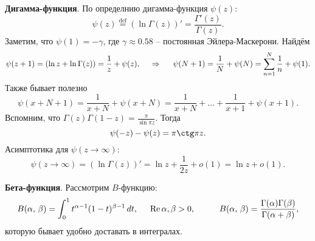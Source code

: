 \textbf{Дигамма-функция}. По определнию дигамма-функция $\psi(z)$:
\begin{equation*}
    \psi(z) \overset{\mathrm{def}}{=}  \left(\ln \Gamma(z)\right)' = \frac{\Gamma'(z)}{\Gamma(z)}.
\end{equation*}
Заметим, что $\psi(1) = - \gamma$, где $\gamma \approx 0.58$ -- постоянная Эйлера-Маскерони. Найдём
\begin{equation*}
    \psi(z+1)= \left(\ln z + \ln \Gamma(z)\right) = \frac{1}{z} + \psi(z),
    \hspace{0.5cm} \Rightarrow \hspace{0.5cm}
    \psi(N+1) = \frac{1}{N} + \psi(N) = \sum_{n=1}^{N} \frac{1}{n} + \psi(1).
\end{equation*}
Также бывает полезно
\begin{equation*}
    \psi(x + N + 1) = \frac{1}{x + N} + \psi(x+ N) = \frac{1}{x+N} + \ldots + \frac{1}{x+1} + \psi(x+1).
\end{equation*}
Вспомним, что $\Gamma(z) \Gamma(1-z) = \frac{\pi}{\sin \pi z}$. Тогда
\begin{equation*}
    \psi(-z) - \psi(z) = \pi \ctg \pi z.
\end{equation*}
Асимптотика для $\psi(z\to \infty)$:
\begin{equation*}
    \psi(z\to \infty) = \left(\ln \Gamma(z)\right)' = \ln z + \frac{1}{2z} + o(1) = \ln z + o(1).
\end{equation*}



\textbf{Бета-функция}. Рассмотрим $B$-функцию:
\begin{equation*}
      B(\alpha,\, \beta) = \int_{0}^{1} t^{\alpha-1} (1-t)^{\beta-1} \d t,
      \hspace{5 mm} 
      \Re \alpha, \beta > 0,
      \hspace{10 mm} 
      B(\alpha,\, \beta) = \frac{\Gamma(\alpha) \Gamma(\beta)}{\Gamma(\alpha + \beta)},
\end{equation*}  
которую бывает удобно доставать в интегралах.



